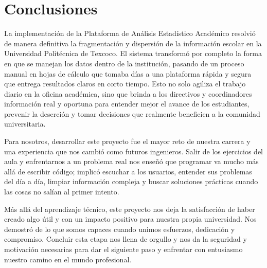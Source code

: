 \chapter{Conclusiones}

La implementación de la Plataforma de Análisis Estadístico Académico resolvió de manera definitiva la fragmentación y dispersión de la información escolar en la Universidad Politécnica de Texcoco. El sistema transformó por completo la forma en que se manejan los datos dentro de la institución, pasando de un proceso manual en hojas de cálculo que tomaba días a una plataforma rápida y segura que entrega resultados claros en corto tiempo. Esto no solo agiliza el trabajo diario en la oficina académica, sino que brinda a los directivos y coordinadores información real y oportuna para entender mejor el avance de los estudiantes, prevenir la deserción y tomar decisiones que realmente beneficien a la comunidad universitaria.

Para nosotros, desarrollar este proyecto fue el mayor reto de nuestra carrera y una experiencia que nos cambió como futuros ingenieros. Salir de los ejercicios del aula y enfrentarnos a un problema real nos enseñó que programar va mucho más allá de escribir código; implicó escuchar a los usuarios, entender sus problemas del día a día, limpiar información compleja y buscar soluciones prácticas cuando las cosas no salían al primer intento.

Más allá del aprendizaje técnico, este proyecto nos deja la satisfacción de haber creado algo útil y con un impacto positivo para nuestra propia universidad. Nos demostró de lo que somos capaces cuando unimos esfuerzos, dedicación y compromiso. Concluir esta etapa nos llena de orgullo y nos da la seguridad y motivación necesarias para dar el siguiente paso y enfrentar con entusiasmo nuestro camino en el mundo profesional.